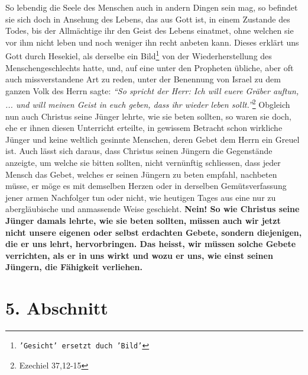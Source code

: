  So lebendig die Seele des Menschen auch in andern
Dingen sein mag, so befindet
sie sich doch in Ansehung des Lebens, das aus Gott ist, in einem Zustande des
Todes, bis der Allmächtige ihr den Geist des Lebens einatmet, ohne welchen sie
vor ihm nicht leben und noch weniger ihn recht anbeten kann. Dieses erklärt uns
Gott durch Hesekiel, als derselbe ein Bild\footnote{\texttt{'Gesicht' ersetzt
duch
'Bild'}} von der Wiederherstellung des
Menschengeschlechts hatte, und,
auf eine unter den Propheten  übliche, aber oft auch
missverstandene Art zu
reden, unter der Benennung von Israel  zu dem
ganzen Volk des Herrn sagte:
\textit{"`So spricht der Herr: Ich will euere Gräber auftun, ... und will meinen
Geist in
euch geben, dass ihr wieder leben sollt."'}\footnote{Ezechiel 37,12-15}
Obgleich nun auch Christus seine
Jünger lehrte, wie sie beten sollten, so waren sie doch, ehe er ihnen diesen
Unterricht erteilte, in gewissem Betracht schon wirkliche Jünger und keine
weltlich gesinnte Menschen, deren Gebet dem Herrn ein Greuel ist. Auch
lässt sich daraus, dass Christus seinen Jüngern die Gegenstände anzeigte, um
welche sie bitten sollten, nicht
vernünftig schliessen, dass jeder Mensch das Gebet, welches er seinen Jüngern zu
beten empfahl, nachbeten  müsse, er möge es mit
demselben Herzen oder in
derselben Gemütsverfassung jener armen Nachfolger tun oder nicht, wie heutigen
Tages aus eine nur zu abergläubische und anmassende Weise geschieht.
\label{ref:06_04_gebet} \textbf{Nein! So
wie Christus seine Jünger damals lehrte, wie sie beten sollten, müssen auch wir
jetzt nicht unsere eigenen oder selbst erdachten Gebete, sondern diejenigen, die
er uns
lehrt, hervorbringen. Das heisst, wir müssen solche Gebete verrichten, als er
in uns wirkt und wozu er uns, wie einst seinen Jüngern, die Fähigkeit
verliehen.}

\section{5. Abschnitt} \label{kap6_ab5}

